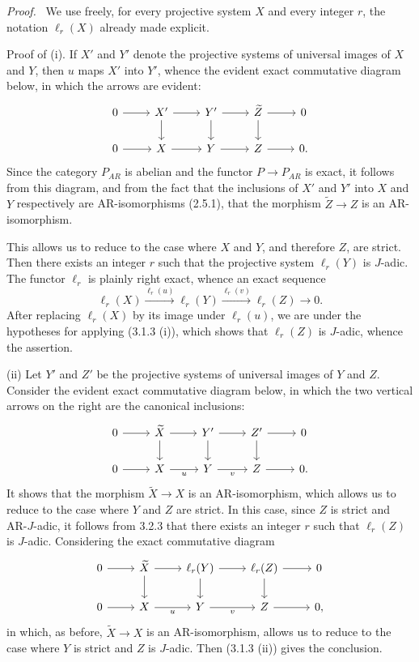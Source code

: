 \documentclass[11pt]{article}
\newenvironment{prooftext}[1][Proof]{\par\noindent\emph{#1.}\ }{\par\medskip}
\begin{document}
\begin{prooftext}[Proof]
We use freely, for every projective system $X$ and every integer $r$, the notation $\ell_r(X)$ already made explicit.

Proof of (i). If $X'$ and $Y'$ denote the projective systems of universal images of $X$ and $Y$, then $u$ maps $X'$ into $Y'$, whence the evident exact commutative diagram below, in which the arrows are evident:
\[
\begin{tikzcd}
0 \arrow[r] & X' \arrow[r] \arrow[d] & Y' \arrow[r] \arrow[d] & \widetilde Z \arrow[r] \arrow[d] & 0\\
0 \arrow[r] & X \arrow[r] & Y \arrow[r] & Z \arrow[r] & 0 .
\end{tikzcd}
\]
Since the category $P_{AR}$ is abelian and the functor $P\to P_{AR}$ is exact, it follows from this diagram, and from the fact that the inclusions of $X'$ and $Y'$ into $X$ and $Y$ respectively are AR-isomorphisms (2.5.1), that the morphism $\widetilde Z\to Z$ is an AR-isomorphism.

This allows us to reduce to the case where $X$ and $Y$, and therefore $Z$, are strict. Then there exists an integer $r$ such that the projective system $\ell_r(Y)$ is $J$-adic. The functor $\ell_r$ is plainly right exact, whence an exact sequence
\[
\ell_r(X)\stackrel{\ell_r(u)}{\longrightarrow}\ell_r(Y)\stackrel{\ell_r(v)}{\longrightarrow}\ell_r(Z)\longrightarrow0.
\]
After replacing $\ell_r(X)$ by its image under $\ell_r(u)$, we are under the hypotheses for applying (3.1.3 (i)), which shows that $\ell_r(Z)$ is $J$-adic, whence the assertion.

(ii) Let $Y'$ and $Z'$ be the projective systems of universal images of $Y$ and $Z$. Consider the evident exact commutative diagram below, in which the two vertical arrows on the right are the canonical inclusions:
\[
\begin{tikzcd}
0 \arrow[r] & \widetilde X \arrow[r] \arrow[d] & Y' \arrow[r] \arrow[d] & Z' \arrow[r] \arrow[d] & 0\\
0 \arrow[r] & X \arrow[r,"u"'] & Y \arrow[r,"v"'] & Z \arrow[r] & 0 .
\end{tikzcd}
\]
It shows that the morphism $\widetilde X\to X$ is an AR-isomorphism, which allows us to reduce to the case where $Y$ and $Z$ are strict. In this case, since $Z$ is strict and AR-$J$-adic, it follows from 3.2.3 that there exists an integer $r$ such that $\ell_r(Z)$ is $J$-adic. Considering the exact commutative diagram
\[
\begin{tikzcd}
0 \arrow[r] & \widetilde X \arrow[r] \arrow[d] & \ell_r(Y) \arrow[r] \arrow[d] & \ell_r(Z) \arrow[r] \arrow[d] & 0\\
0 \arrow[r] & X \arrow[r,"u"'] & Y \arrow[r,"v"'] & Z \arrow[r] & 0,
\end{tikzcd}
\]
in which, as before, $\widetilde X\to X$ is an AR-isomorphism, allows us to reduce to the case where $Y$ is strict and $Z$ is $J$-adic. Then (3.1.3 (ii)) gives the conclusion.
\end{prooftext}
\end{document}
